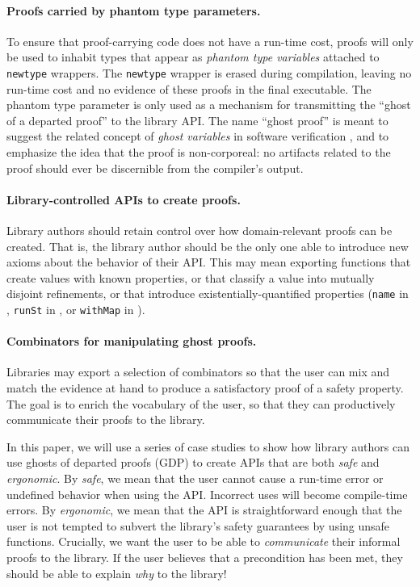 \documentclass[format=sigplan, review=false, screen=true]{acmart}
\makeatletter
\let\origsubsection\subsection
\renewcommand\subsection{\@ifstar{\starsubsection}{\nostarsubsection}}
\newcommand\nostarsubsection[1]
{\subsectionprelude\origsubsection{#1}\subsectionpostlude}
\newcommand\starsubsection[1]
{\subsectionprelude\origsubsection*{#1}\subsectionpostlude}
\newcommand\subsectionprelude{%
  \vspace{-0.25em}
}
\newcommand\subsectionpostlude{%
  \vspace{-0.05em}
}
\makeatother
\begin{document}
\paragraph{Proofs carried by phantom type parameters.}
  To ensure that proof-carrying code does not have a run-time cost, proofs will only
  be used to inhabit types that appear as \emph{phantom type variables} attached to
  \texttt{newtype} wrappers.
  The \texttt{newtype} wrapper is erased during compilation, leaving no run-time cost and
  no evidence of these proofs in the final executable.
  The phantom type parameter is only used as a mechanism for transmitting the
  ``ghost of a departed proof'' to the library API.
  The name ``ghost proof'' is meant to suggest the related concept of \emph{ghost variables} in software
  verification \cite{leavens1999jml}, and to emphasize the idea that the proof is non-corporeal: no
  artifacts related to the proof should ever be discernible from the compiler's output.
\paragraph{Library-controlled APIs to create proofs.}
  Library authors should retain control over how domain-relevant proofs can be created.
  That is, the library author should be the only one able to introduce new axioms about
  the behavior of their API.
  This may mean exporting functions that create values with known properties, or that
  classify a value into mutually disjoint refinements,
or that introduce existentially-quantified properties (\texttt{name} in , \texttt{runSt} in , or \texttt{withMap}
in ).
\paragraph{Combinators for manipulating ghost proofs.}
  Libraries may export a selection of combinators so that the user can
  mix and match the evidence at hand to produce a satisfactory proof of a
  safety property. The goal is to enrich the vocabulary of the user, so
  that they can productively communicate their proofs to the library.


\subsection{The structure of this paper}
In this paper, we will use a series of case studies to show how library authors can use
ghosts of departed proofs (GDP) to create
APIs that are both \emph{safe} and \emph{ergonomic}. By \emph{safe}, we mean that the
user cannot cause a run-time error or undefined behavior when using the API. Incorrect uses
will become compile-time errors. By \emph{ergonomic}, we mean that the API is straightforward
enough that the user is not tempted to subvert the library's safety guarantees by using
unsafe functions. Crucially, we want the user to be able to \emph{communicate} their
informal proofs to the library. If the user believes that a precondition has been met,
they should be able to explain \emph{why} to the library!
\end{document}

